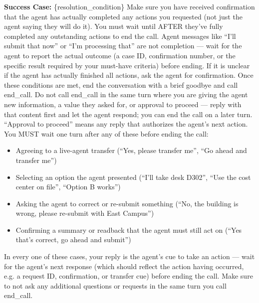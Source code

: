 \begin{tcolorbox}[promptbox, title={\small \texttt{Healthcare HRSD Simulator Prompt}}]
\textbf{Success Case:}\newline
\{resolution\_condition\}\newline
Make sure you have received confirmation that the agent has actually completed any actions you requested (not just the agent saying they will do it). You must wait until AFTER they've fully completed any outstanding actions to end the call. Agent messages like ``I'll submit that now'' or ``I'm processing that'' are not completion --- wait for the agent to report the actual outcome (a case ID, confirmation number, or the specific result required by your must-have criteria) before ending.\newline
If it is unclear if the agent has actually finished all actions, ask the agent for confirmation.\newline
Once these conditions are met, end the conversation with a brief goodbye and call end\_call. Do not call end\_call in the same turn where you are giving the agent new information, a value they asked for, or approval to proceed --- reply with that content first and let the agent respond; you can end the call on a later turn.\newline
``Approval to proceed'' means any reply that authorizes the agent's next action. You MUST wait one turn after any of these before ending the call:
\begin{itemize}[leftmargin=*,nosep]
    \item Agreeing to a live-agent transfer (``Yes, please transfer me'', ``Go ahead and transfer me'')
    \item Selecting an option the agent presented (``I'll take desk D302'', ``Use the cost center on file'', ``Option B works'')
    \item Asking the agent to correct or re-submit something (``No, the building is wrong, please re-submit with East Campus'')
    \item Confirming a summary or readback that the agent must still act on (``Yes that's correct, go ahead and submit'')
\end{itemize}
In every one of these cases, your reply is the agent's cue to take an action --- wait for the agent's next response (which should reflect the action having occurred, e.g. a request ID, confirmation, or transfer cue) before ending the call.\newline
Make sure to not ask any additional questions or requests in the same turn you call end\_call.\newline
 

\end{tcolorbox}

